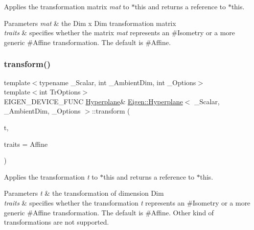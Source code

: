 Applies the transformation matrix {\itshape mat} to {\ttfamily $\ast$this} and returns a reference to {\ttfamily $\ast$this}.


\begin{DoxyParams}{Parameters}
{\em mat} & the Dim x Dim transformation matrix \\
\hline
{\em traits} & specifies whether the matrix {\itshape mat} represents an \#\+Isometry or a more generic \#\+Affine transformation. The default is \#\+Affine. \\
\hline
\end{DoxyParams}
\mbox{\label{class_eigen_1_1_hyperplane_a1705f330bad337dc4a62814b5f9c4af1}} 
\subsubsection{\texorpdfstring{transform()}{transform()}\hspace{0.1cm}{\footnotesize\ttfamily [2/2]}}
{\footnotesize\ttfamily template$<$typename \+\_\+\+Scalar, int \+\_\+\+Ambient\+Dim, int \+\_\+\+Options$>$ \\
template$<$int Tr\+Options$>$ \\
E\+I\+G\+E\+N\+\_\+\+D\+E\+V\+I\+C\+E\+\_\+\+F\+U\+NC \mbox{\hyperlink{class_eigen_1_1_hyperplane}{Hyperplane}}\& \mbox{\hyperlink{class_eigen_1_1_hyperplane}{Eigen\+::\+Hyperplane}}$<$ \+\_\+\+Scalar, \+\_\+\+Ambient\+Dim, \+\_\+\+Options $>$\+::transform (\begin{DoxyParamCaption}\item[{const \mbox{\hyperlink{class_eigen_1_1_transform}{Transform}}$<$ Scalar, Ambient\+Dim\+At\+Compile\+Time, Affine, Tr\+Options $>$ \&}]{t,  }\item[{\mbox{\hyperlink{group__enums_gaee59a86102f150923b0cac6d4ff05107}{Transform\+Traits}}}]{traits = {\ttfamily Affine} }\end{DoxyParamCaption})\hspace{0.3cm}{\ttfamily [inline]}}

Applies the transformation {\itshape t} to {\ttfamily $\ast$this} and returns a reference to {\ttfamily $\ast$this}.


\begin{DoxyParams}{Parameters}
{\em t} & the transformation of dimension Dim \\
\hline
{\em traits} & specifies whether the transformation {\itshape t} represents an \#\+Isometry or a more generic \#\+Affine transformation. The default is \#\+Affine. Other kind of transformations are not supported. \\
\hline
\end{DoxyParams}


